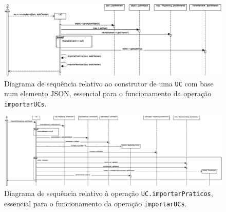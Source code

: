 \documentclass[12pt, a4paper]{article}
\begin{document}
\begin{landscape}
        \vspace*{\fill}
        \pagebreak
        \vspace*{\fill}

        \begin{figure}[H]
            \centering
            \includegraphics[scale=0.8]{Imagens/Modelos/importarUCsConstrutorUC.svg.eps}
            \caption{
                Diagrama de sequência relativo ao construtor de uma \texttt{UC} com base num
                elemento JSON, essencial para o funcionamento da operação \texttt{importarUCs}.
            }
        \end{figure}

        \vspace*{\fill}
        \pagebreak
        \vspace*{\fill}

        \begin{figure}[H]
            \centering
            \includegraphics[scale=0.50]{Imagens/Modelos/importarUCsConstrutorUCimportarPraticos.svg.eps}
            \caption{
                Diagrama de sequência relativo à operação \texttt{UC.importarPraticos}, essencial para o
                funcionamento da operação \texttt{importarUCs}.
            }
        \end{figure}

        \vspace*{\fill}
        \pagebreak
        \vspace*{\fill}


\end{landscape}
\end{document}
